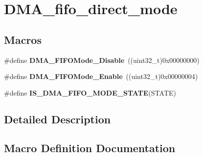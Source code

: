 \hypertarget{group___d_m_a__fifo__direct__mode}{}\section{D\+M\+A\+\_\+fifo\+\_\+direct\+\_\+mode}
\label{group___d_m_a__fifo__direct__mode}
\subsection*{Macros}
\begin{DoxyCompactItemize}
\item 
\hypertarget{group___d_m_a__fifo__direct__mode_gadad9e503fa9867a981e3090d333483d7}{}\#define {\bfseries D\+M\+A\+\_\+\+F\+I\+F\+O\+Mode\+\_\+\+Disable}~((uint32\+\_\+t)0x00000000)\label{group___d_m_a__fifo__direct__mode_gadad9e503fa9867a981e3090d333483d7}

\item 
\hypertarget{group___d_m_a__fifo__direct__mode_ga482bc2af420602d1a8c2aa35049a3857}{}\#define {\bfseries D\+M\+A\+\_\+\+F\+I\+F\+O\+Mode\+\_\+\+Enable}~((uint32\+\_\+t)0x00000004)\label{group___d_m_a__fifo__direct__mode_ga482bc2af420602d1a8c2aa35049a3857}

\item 
\#define {\bfseries I\+S\+\_\+\+D\+M\+A\+\_\+\+F\+I\+F\+O\+\_\+\+M\+O\+D\+E\+\_\+\+S\+T\+A\+T\+E}(S\+T\+A\+T\+E)
\end{DoxyCompactItemize}


\subsection{Detailed Description}


\subsection{Macro Definition Documentation}
\hypertarget{group___d_m_a__fifo__direct__mode_gadb90a893aeb49fd4bc14af750af3837c}{}
